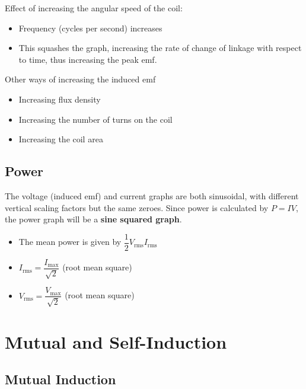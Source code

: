 \documentclass[a4paper,12pt]{article}
\let\oldsection\section
\renewcommand\section{\clearpage\oldsection}
\begin{document}
Effect of increasing the angular speed of the coil:
\begin{itemize}
  \item Frequency (cycles per second) increases
  \item This squashes the graph, increasing the rate of change of linkage with respect to time, thus increasing the peak emf.
\end{itemize}

Other ways of increasing the induced emf
\begin{itemize}
  \item Increasing flux density
  \item Increasing the number of turns on the coil
  \item Increasing the coil area
\end{itemize}

\subsection{Power}

The voltage (induced emf) and current graphs are both sinusoidal, with different vertical scaling factors but the same zeroes. Since power is calculated by $P = IV$, the power graph will be a \textbf{sine squared graph}.
\begin{itemize}
  \item The mean power is given by $\dfrac{1}{2}V_{\text{rms}}I_{\text{rms}}$
  \item $I_{\text{rms}} = \dfrac{I_{\text{max}}}{\sqrt{2}}$ (root mean square)
  \item $V_{\text{rms}} = \dfrac{V_{\text{max}}}{\sqrt{2}}$ (root mean square)
\end{itemize}

\section{Mutual and Self-Induction}

\subsection{Mutual Induction}
\end{document}
